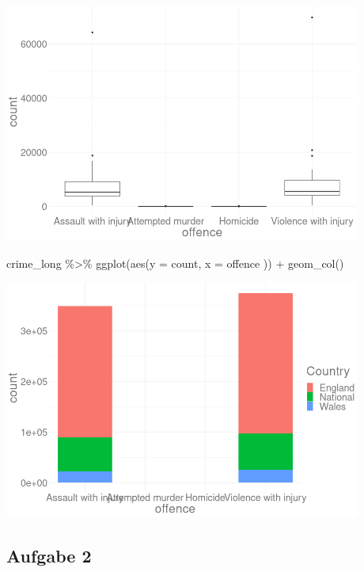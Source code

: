 \documentclass[
]{book}
\newenvironment{Shaded}{\begin{snugshade}}{\end{snugshade}}
\newcommand{\AttributeTok}[1]{\textcolor[rgb]{0.77,0.63,0.00}{#1}}
\newcommand{\FunctionTok}[1]{\textcolor[rgb]{0.00,0.00,0.00}{#1}}
\newcommand{\NormalTok}[1]{#1}
\newcommand{\SpecialCharTok}[1]{\textcolor[rgb]{0.00,0.00,0.00}{#1}}
\begin{document}
\begin{center}\includegraphics[width=333.333333333333pt]{imgs/pts5} \end{center}

\begin{Shaded}
\begin{Highlighting}[]
\NormalTok{crime\_long }\SpecialCharTok{\%\textgreater{}\%}
  \FunctionTok{ggplot}\NormalTok{(}\FunctionTok{aes}\NormalTok{(}\AttributeTok{y =}\NormalTok{ count,}
             \AttributeTok{x =}\NormalTok{ offence}
\NormalTok{             )) }\SpecialCharTok{+}
  \FunctionTok{geom\_col}\NormalTok{()}
\end{Highlighting}
\end{Shaded}

\begin{center}\includegraphics[width=333.333333333333pt]{imgs/pts6} \end{center}

\hypertarget{aufgabe-2-3}{%
\subsection{Aufgabe 2}\label{aufgabe-2-3}}
\end{document}
